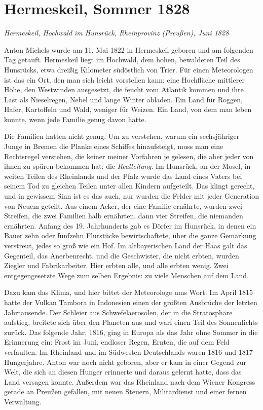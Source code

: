 \documentclass[
  ngerman,
  11pt,
  openany]{book}
\begin{document}
\section{Hermeskeil, Sommer 1828}\label{hermeskeil-sommer-1828}

\emph{Hermeskeil, Hochwald im Hunsrück, Rheinprovinz (Preußen), Juni
1828}

Anton Michels wurde am 11. Mai 1822 in Hermeskeil geboren und am
folgenden Tag getauft. Hermeskeil liegt im Hochwald, dem hohen,
bewaldeten Teil des Hunsrücks, etwa dreißig Kilometer südöstlich von
Trier. Für einen Meteorologen ist das ein Ort, den man sich leicht
vorstellen kann: eine Hochfläche mittlerer Höhe, den Westwinden
ausgesetzt, die feucht vom Atlantik kommen und ihre Last als
Nieselregen, Nebel und lange Winter abladen. Ein Land für Roggen, Hafer,
Kartoffeln und Wald, weniger für Weizen. Ein Land, von dem man leben
konnte, wenn jede Familie genug davon hatte.

Die Familien hatten nicht genug. Um zu verstehen, warum ein
sechsjähriger Junge in Bremen die Planke eines Schiffes hinaufsteigt,
muss man eine Rechtsregel verstehen, die keiner meiner Vorfahren je
gelesen, die aber jeder von ihnen zu spüren bekommen hat: die
\emph{Realteilung}. Im Hunsrück, an der Mosel, in weiten Teilen des
Rheinlands und der Pfalz wurde das Land eines Vaters bei seinem Tod zu
gleichen Teilen unter allen Kindern aufgeteilt. Das klingt gerecht, und
in gewissem Sinn ist es das auch, nur wurden die Felder mit jeder
Generation von Neuem geteilt. Aus einem Acker, der eine Familie
ernährte, wurden zwei Streifen, die zwei Familien halb ernährten, dann
vier Streifen, die niemanden ernährten. Anfang des 19. Jahrhunderts gab
es Dörfer im Hunsrück, in denen ein Bauer zehn oder fünfzehn Flurstücke
bewirtschaftete, über die ganze Gemarkung verstreut, jedes so groß wie
ein Hof. Im altbayerischen Land der Haas galt das Gegenteil, das
Anerbenrecht, und die Geschwister, die nicht erbten, wurden Ziegler und
Fabrikarbeiter. Hier erbten alle, und alle erbten wenig. Zwei
entgegengesetzte Wege zum selben Ergebnis: zu viele Menschen auf dem
Land.

Dazu kam das Klima, und hier bittet der Meteorologe ums Wort. Im April
1815 hatte der Vulkan Tambora in Indonesien einen der größten Ausbrüche
der letzten Jahrtausende. Der Schleier aus Schwefelaerosolen, der in die
Stratosphäre aufstieg, breitete sich über den Planeten aus und warf
einen Teil des Sonnenlichts zurück. Das folgende Jahr, 1816, ging in
Europa als das Jahr ohne Sommer in die Erinnerung ein: Frost im Juni,
endloser Regen, Ernten, die auf dem Feld verfaulten. Im Rheinland und im
Südwesten Deutschlands waren 1816 und 1817 Hungerjahre. Anton war noch
nicht geboren, aber er kam in einer Gegend zur Welt, die sich an diesen
Hunger erinnerte und daraus gelernt hatte, dass das Land versagen
konnte. Außerdem war das Rheinland nach dem Wiener Kongress gerade an
Preußen gefallen, mit neuen Steuern, Militärdienst und einer fernen
Verwaltung.
\end{document}
